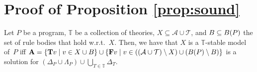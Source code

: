 \section{Proof of Proposition \ref{prop:sound}}\label{sec:proof}
\addtocounter{proposition}{-1}

\begin{proposition}
Let $P$ be a %
program, %
$\mathbb{T}$ be 
a collection of theories,
$X\subseteq\mathcal{A}\cup\mathcal{T}$, and
$B\subseteq B(P)$ %
the set of rule bodies that hold w.r.t.~$X$.
Then, we have that $X$ is a $\mathbb{T}$-stable model of~$P$ iff
$\mathbf{A}=\{\mathbf{T} v\mid v\in X\cup B\}\cup\{\mathbf{F} v\mid v\in ((\mathcal{A}\cup\mathcal{T})\setminus X)\cup(B(P)\setminus B)\}$
is a solution for
$(\Delta_P\cup\Lambda_P)\cup\bigcup_{T\in\mathbb{T}}\Delta_T$.
\end{proposition}

